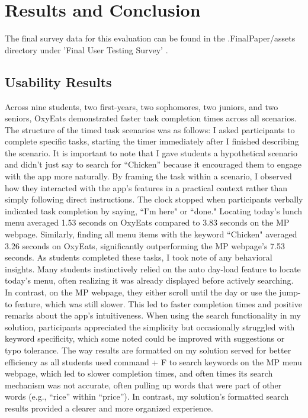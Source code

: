 \documentclass[10pt,twocolumn]{article}
\begin{document}
\section{Results and Conclusion}
The final survey data for this evaluation can be found in the .FinalPaper/assets directory under 'Final User Testing Survey' \cite{GitHubRepo}.

\subsection{Usability Results}

Across nine students, two first-years, two sophomores, two juniors, and two seniors, OxyEats demonstrated faster task completion times across all scenarios. The structure of the timed task scenarios was as follows: I asked participants to complete specific tasks, starting the timer immediately after I finished describing the scenario. It is important to note that I gave students a hypothetical scenario and didn't just say to search for “Chicken” because it encouraged them to engage with the app more naturally. By framing the task within a scenario, I observed how they interacted with the app's features in a practical context rather than simply following direct instructions. The clock stopped when participants verbally indicated task completion by saying, ``I'm here" or ``done." Locating today's lunch menu averaged 1.53 seconds on OxyEats compared to 3.83 seconds on the MP webpage. Similarly, finding all menu items with the keyword ``Chicken" averaged 3.26 seconds on OxyEats, significantly outperforming the MP webpage's 7.53 seconds. As students completed these tasks, I took note of any behavioral insights. Many students instinctively relied on the auto day-load feature to locate today's menu, often realizing it was already displayed before actively searching. In contrast, on the MP webpage, they either scroll until the day or use the jump-to feature, which was still slower. This led to faster completion times and positive remarks about the app’s intuitiveness. When using the search functionality in my solution, participants appreciated the simplicity but occasionally struggled with keyword specificity, which some noted could be improved with suggestions or typo tolerance. The way results are formatted on my solution served for better efficiency as all students used command + F to search keywords on the MP menu webpage, which led to slower completion times, and often times its search mechanism was not accurate, often pulling up words that were part of other words (e.g., “rice” within “price”). In contrast, my solution's formatted search results provided a clearer and more organized experience.  
\end{document}

